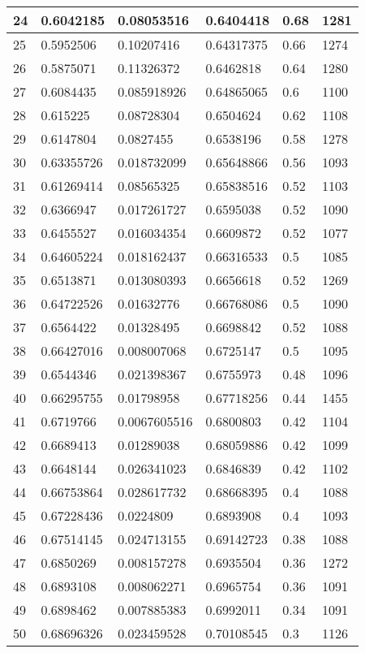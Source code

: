 \begin{longtable}{|l|l|l|l|l|l|}
24 & 0.6042185 & 0.08053516 & 0.6404418 & 0.68 & 1281 \\ \hline 
25 & 0.5952506 & 0.10207416 & 0.64317375 & 0.66 & 1274 \\ \hline 
26 & 0.5875071 & 0.11326372 & 0.6462818 & 0.64 & 1280 \\ \hline 
27 & 0.6084435 & 0.085918926 & 0.64865065 & 0.6 & 1100 \\ \hline 
28 & 0.615225 & 0.08728304 & 0.6504624 & 0.62 & 1108 \\ \hline 
29 & 0.6147804 & 0.0827455 & 0.6538196 & 0.58 & 1278 \\ \hline 
30 & 0.63355726 & 0.018732099 & 0.65648866 & 0.56 & 1093 \\ \hline 
31 & 0.61269414 & 0.08565325 & 0.65838516 & 0.52 & 1103 \\ \hline 
32 & 0.6366947 & 0.017261727 & 0.6595038 & 0.52 & 1090 \\ \hline 
33 & 0.6455527 & 0.016034354 & 0.6609872 & 0.52 & 1077 \\ \hline 
34 & 0.64605224 & 0.018162437 & 0.66316533 & 0.5 & 1085 \\ \hline 
35 & 0.6513871 & 0.013080393 & 0.6656618 & 0.52 & 1269 \\ \hline 
36 & 0.64722526 & 0.01632776 & 0.66768086 & 0.5 & 1090 \\ \hline 
37 & 0.6564422 & 0.01328495 & 0.6698842 & 0.52 & 1088 \\ \hline 
38 & 0.66427016 & 0.008007068 & 0.6725147 & 0.5 & 1095 \\ \hline 
39 & 0.6544346 & 0.021398367 & 0.6755973 & 0.48 & 1096 \\ \hline 
40 & 0.66295755 & 0.01798958 & 0.67718256 & 0.44 & 1455 \\ \hline 
41 & 0.6719766 & 0.0067605516 & 0.6800803 & 0.42 & 1104 \\ \hline 
42 & 0.6689413 & 0.01289038 & 0.68059886 & 0.42 & 1099 \\ \hline 
43 & 0.6648144 & 0.026341023 & 0.6846839 & 0.42 & 1102 \\ \hline 
44 & 0.66753864 & 0.028617732 & 0.68668395 & 0.4 & 1088 \\ \hline 
45 & 0.67228436 & 0.0224809 & 0.6893908 & 0.4 & 1093 \\ \hline 
46 & 0.67514145 & 0.024713155 & 0.69142723 & 0.38 & 1088 \\ \hline 
47 & 0.6850269 & 0.008157278 & 0.6935504 & 0.36 & 1272 \\ \hline 
48 & 0.6893108 & 0.008062271 & 0.6965754 & 0.36 & 1091 \\ \hline 
49 & 0.6898462 & 0.007885383 & 0.6992011 & 0.34 & 1091 \\ \hline 
50 & 0.68696326 & 0.023459528 & 0.70108545 & 0.3 & 1126 \\ \hline 
\end{longtable}